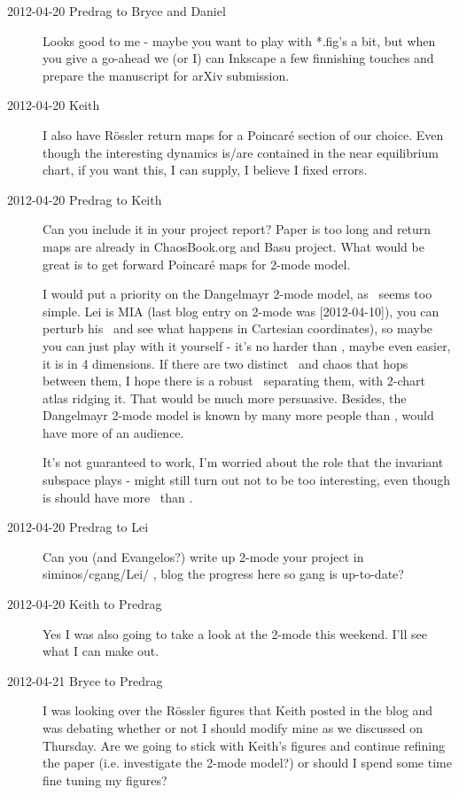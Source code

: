 \begin{description}
\item[2012-04-20 Predrag to Bryce and Daniel] Looks good to me - maybe
you want to play with *.fig's a bit, but when you give a go-ahead we (or
I) can Inkscape a few finnishing touches and prepare the manuscript for
arXiv submission.

\item[2012-04-20 Keith] I also have R\"ossler return maps for a
Poincar\'e section of our choice.  Even though the interesting dynamics
is/are contained in the near equilibrium chart, if you want this, I can
supply, I believe I fixed errors.

\item[2012-04-20 Predrag to Keith] Can you include it in your project report?
Paper is too long and return maps are already in ChaosBook.org and Basu project.
What would be great is to get forward Poincar\'e maps for 2-mode model.

I would put a priority on the Dangelmayr 2-mode model, as \cLe\ seems too
simple. Lei is MIA (last blog entry on 2-mode was [2012-04-10]), you can
perturb his \reqva\ and see what happens in Cartesian coordinates), so
maybe you can just play with it yourself - it's no harder than \cLe,
maybe even easier, it is in 4 dimensions. If there are two distinct
\reqva\ and chaos that hops between them, I hope there is a robust
\chartBord\ separating them, with 2-chart atlas ridging it. That would be
much more persuasive. Besides, the Dangelmayr 2-mode model is known by
many more people than \cLe, would have more of an audience.

It's not guaranteed to work, I'm worried about the role that the
invariant subspace plays - might still turn out not to be too
interesting, even though is should have more \reqva\ than \cLe.


\item[2012-04-20 Predrag to Lei] Can you (and Evangelos?) write up 2-mode
your project in siminos/cgang/Lei/ , blog the progress here so gang is
up-to-date?

\item[2012-04-20 Keith to Predrag]  Yes I was also going to take a look
at the 2-mode this weekend.  I'll see what I can make out.

\item[2012-04-21 Bryce to Predrag] I was looking over the R\"ossler
figures that Keith posted in the blog and was debating whether or not I
should modify mine as we discussed on Thursday. Are we going to stick
with Keith's figures and continue refining the paper (i.e. investigate
the 2-mode model?) or should I spend some time fine tuning my figures?


\end{description}
